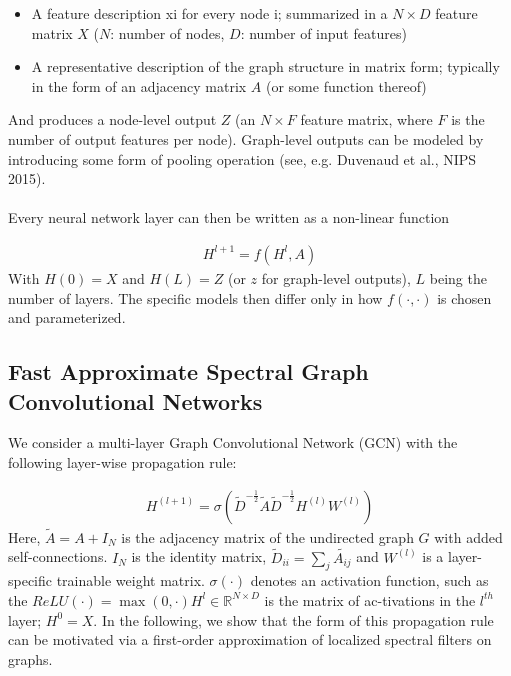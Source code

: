 \documentclass[12pt,a4paper]{article}
\begin{document}
\begin{itemize}
\item A feature description xi for every node i; summarized in a $N \times D$ feature matrix $X$ ($N$: number of nodes, $D$: number of input features)

\item A representative description of the graph structure in matrix form; typically in the form of an adjacency matrix $A$ (or some function thereof)
\end{itemize}
And produces a node-level output $Z$ (an $N \times F$ feature matrix, where $F$ is the number of output features per node). Graph-level outputs can be modeled by introducing some form of pooling operation (see, e.g. Duvenaud et al., NIPS 2015).
\\ \\
Every neural network layer can then be written as a non-linear function 

\begin{align*}
H^{l+1} = f(H^{l},A)
\end{align*}
With $H(0)=X$ and $H(L)=Z$ (or $z$ for graph-level outputs), $L$ being the number of layers. The specific models then differ only in how $f(\cdot,\cdot)$ is chosen and parameterized.


\subsection*{Fast Approximate Spectral Graph Convolutional Networks}

We consider a multi-layer Graph Convolutional Network (GCN) with the following layer-wise propagation rule:

\begin{align*}
H^{(l+1)} = \sigma( \tilde{D}^{-\frac{1}{2}} \tilde{A} \tilde{D}^{-\frac{1}{2}} H^{(l)} W^{(l)})
\end{align*}
Here, $\tilde{A} = A +I_{N}$ is the adjacency matrix of the undirected graph $G$ with added self-connections. $I_{N}$ is the identity matrix, $\tilde{D}_{ii} = \sum_{j} \tilde{A_{ij}}$ and $W^{(l)}$ is a layer-specific trainable weight matrix. $\sigma(\cdot)$ denotes an activation function, such as the $ReLU( \cdot ) = \max(0,\cdot)H^{l} \in \mathbb{R}^{N \times D}$ is the matrix of ac-tivations in the $l^{th}$ layer; $H^{0}=X$. In the following, we show that the form of this propagation rule can be motivated via a first-order approximation of localized spectral filters on graphs.
\end{document}
